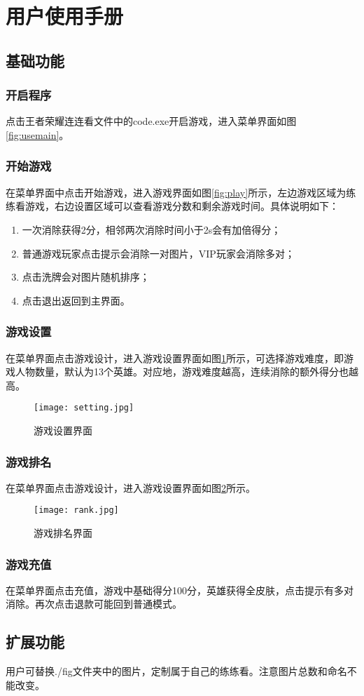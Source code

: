 \section{用户使用手册}
\subsection{基础功能}
\subsubsection{开启程序}
点击王者荣耀连连看文件中的code.exe开启游戏，进入菜单界面如图\ref{fig:usemain}。

\subsubsection{开始游戏}
在菜单界面中点击开始游戏，进入游戏界面如图\ref{fig:play}所示，左边游戏区域为练练看游戏，右边设置区域可以查看游戏分数和剩余游戏时间。具体说明如下：
\begin{enumerate}
    \item 一次消除获得2分，相邻两次消除时间小于2s会有加倍得分；
    \item 普通游戏玩家点击提示会消除一对图片，VIP玩家会消除多对；
    \item 点击洗牌会对图片随机排序；
    \item 点击退出返回到主界面。
\end{enumerate}

\subsubsection{游戏设置}
在菜单界面点击游戏设计，进入游戏设置界面如图\ref{fig:setting2}所示，可选择游戏难度，即游戏人物数量，默认为13个英雄。对应地，游戏难度越高，连续消除的额外得分也越高。
\begin{figure}[!htbp]
        \centering
        \texttt{[image: setting.jpg]}
        \caption{游戏设置界面} \label{fig:setting2}
\end{figure}

\subsubsection{游戏排名}
在菜单界面点击游戏设计，进入游戏设置界面如图\ref{fig:rank2}所示。
\begin{figure}[!htbp]
        \centering
        \texttt{[image: rank.jpg]}
        \caption{游戏排名界面} \label{fig:rank2}
\end{figure}

\subsubsection{游戏充值}
在菜单界面点击充值，游戏中基础得分100分，英雄获得全皮肤，点击提示有多对消除。再次点击退款可能回到普通模式。

\subsection{扩展功能}
用户可替换./fig文件夹中的图片，定制属于自己的练练看。注意图片总数和命名不能改变。
